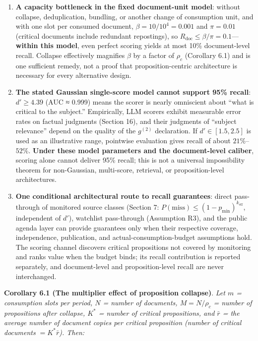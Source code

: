 \documentclass[
  11pt]{article}
\providecommand{\tightlist}{%
  \setlength{\itemsep}{0pt}\setlength{\parskip}{0pt}}
\begin{document}
\begin{enumerate}
\def\labelenumi{\arabic{enumi}.}
\tightlist
\item
  \textbf{A capacity bottleneck in the fixed document-unit model}:
  without collapse, deduplication, bundling, or another change of
  consumption unit, and with one slot per consumed document,
  \(\beta = 10/10^4 = 0.001\) and \(\pi = 0.01\) (critical documents
  include redundant repostings), so
  \(R_{\mathrm{doc}} \le \beta/\pi = 0.1\)---\textbf{within this model},
  even perfect scoring yields at most 10\% document-level recall.
  Collapse effectively magnifies \(\beta\) by a factor of \(\rho_c\)
  (Corollary 6.1) and is one sufficient remedy, not a proof that
  proposition-centric architecture is necessary for every alternative
  design.
\item
  \textbf{The stated Gaussian single-score model cannot support 95\%
  recall}: \(d' \ge 4.39\) (AUC ≈ 0.999) means the scorer is nearly
  omniscient about ``what is critical to the subject.'' Empirically, LLM
  scorers exhibit measurable error rates on factual judgments (Section
  16), and their judgments of ``subject relevance'' depend on the
  quality of the \(g^{(2)}\) declaration. If \(d' \in [1.5, 2.5]\) is
  used as an illustrative range, pointwise evaluation gives recall of
  about \(21\%\)--\(52\%\). \textbf{Under these model parameters and the
  document-level caliber}, scoring alone cannot deliver 95\% recall;
  this is not a universal impossibility theorem for non-Gaussian,
  multi-score, retrieval, or proposition-level architectures.
\item
  \textbf{One conditional architectural route to recall guarantees}:
  direct pass-through of monitored source classes (Section 7:
  \(P(\mathrm{miss}) \le (1-p_{\min})^{k_{\mathrm{eff}}}\), independent
  of \(d'\)), watchlist pass-through (Assumption R3), and the public
  agenda layer can provide guarantees only when their respective
  coverage, independence, publication, and actual-consumption-budget
  assumptions hold. The scoring channel discovers critical propositions
  not covered by monitoring and ranks value when the budget binds; its
  recall contribution is reported separately, and document-level and
  proposition-level recall are never interchanged.
\end{enumerate}

\textbf{Corollary 6.1 (The multiplier effect of proposition collapse)}.
\emph{Let \(m\) = consumption slots per period, \(N\) = number of
documents, \(M = N/\rho_c\) = number of propositions after collapse,
\(K^*\) = number of critical propositions, and \(\bar r\) = the average
number of document copies per critical proposition (number of critical
documents \(= K^*\bar r\)). Then:}
\end{document}
